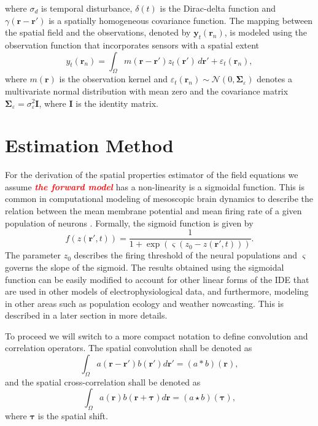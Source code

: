 \documentclass[10pt,twocolumn,twoside]{IEEEtran}
\newcommand{\dean}[1]{\textsf{\emph{\textbf{\textcolor{red}{#1}}}}}
\begin{document}
where $\sigma_d$ is temporal disturbance, $\delta(t)$ is the Dirac-delta function and $\gamma(\mathbf{r}-\mathbf{r'})$ is a spatially homogeneous covariance function. The mapping between the spatial field and the observations, denoted by $\mathbf{y}_t(\mathbf{r}_n)$, is modeled using the observation function that incorporates sensors with a spatial extent
\begin{equation}\label{eq:ObservationEquation}
	y_t(\mathbf{r}_n) = \int_{\Omega} { m\left(\mathbf{r}-\mathbf{r}'\right) z_t\left(\mathbf{r}'\right) \, d\mathbf{r}'} + \varepsilon_t(\mathbf{r}_n), 
\end{equation}
where $m\left(\mathbf{r}\right)$ is the observation kernel and $\varepsilon_t(\mathbf{r}_n) \sim \mathcal{N}\left(0,\boldsymbol{\Sigma}_{\varepsilon}\right)$ denotes a multivariate normal distribution with mean zero and the covariance matrix $\boldsymbol{\Sigma}_{\varepsilon} = \sigma_{\varepsilon}^2\mathbf{I}$, where $\mathbf{I}$ is the identity matrix.

\section{Estimation Method}\label{sec:EstimationMethod}
For the derivation of the spatial properties estimator of the field equations we assume \dean{the forward model} has a non-linearity is a sigmoidal function. This is common in computational modeling of mesoscopic brain dynamics to describe the relation between the mean membrane potential and mean firing rate of a given population of neurons \cite{Freeman1975}. Formally, the sigmoid function is given by
\begin{equation}
	\label{ActivationFunction} f\left( z\left( \mathbf{r}', t \right) \right) = \frac{1}{1 + \exp \left( \varsigma \left( z_0 - z\left(\mathbf{r}',t\right) \right) \right)}. 
\end{equation}
The parameter $z_0$ describes the firing threshold of the neural populations and $\varsigma$ governs the slope of the sigmoid. The results obtained using the sigmoidal function can be easily modified to account for other linear forms of the IDE that are used in other models of electrophysiological data, and furthermore, modeling in other areas such as population ecology and weather nowcasting. This is described in a later section in more details. 

To proceed we will switch to a more compact notation to define convolution and correlation operators. The spatial convolution shall be denoted as
\begin{equation}
	\int_\Omega a(\mathbf{r}-\mathbf{r}')b(\mathbf{r}')d\mathbf{r}' = (a\ast b)(\mathbf{r}),
\end{equation}
and the spatial cross-correlation shall be denoted as 
\begin{equation}
	\int_\Omega a(\mathbf{r})b(\mathbf{r}+\boldsymbol{\tau})d\mathbf{r} = (a\star b)(\boldsymbol{\tau}),
\end{equation} 
where $\boldsymbol{\tau}$ is the spatial shift.
\end{document}
